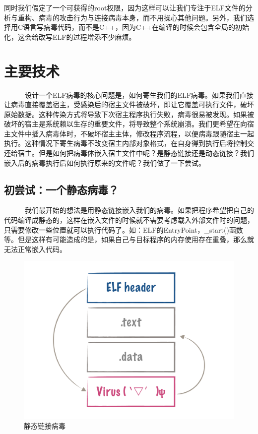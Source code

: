 \documentclass[11pt]{article}
\begin{document}
	同时我们假定了一个可获得的root权限，因为这样可以让我们专注于ELF文件的分析与重构、病毒的攻击行为与连接病毒本身，而不用操心其他问题。另外，我们选择用C语言写病毒代码，而不是C++，因为C++在编译的时候会包含全局的初始化，这会给改写ELF的过程增添不少麻烦。

\newpage
\section{主要技术}
~~~~~~设计一个ELF病毒的核心问题是，如何寄生我们的ELF病毒。如果我们直接让病毒直接覆盖宿主，受感染后的宿主文件被破坏，即让它覆盖可执行文件，破坏原始数据。这种传染方式将导致下次宿主程序执行失败，病毒很易被发现。如果被破坏的宿主是系统赖以生存的重要文件，将导致整个系统崩溃。我们更希望在向宿主文件中插入病毒体时，不破坏宿主主体，修改程序流程，以便病毒跟随宿主一起执行。这种情况下寄生病毒不改变宿主内部对象格式，在自身得到执行后将控制交还给宿主。但是如何把病毒体嵌入宿主文件中呢？是静态链接还是动态链接？我们嵌入后的病毒执行后如何执行原来的文件呢？我们做了一下尝试。
\subsection{初尝试：一个静态病毒？}
~~~~~~我们最开始的想法是用静态链接嵌入我们的病毒。如果把程序希望把自己的代码编译成静态的，这样在嵌入文件的时候就不需要考虑载入外部文件时的问题，只需要修改一些位置就可以执行代码了。如：ELF的EntryPoint，\_start()函数等。但是这样有可能造成的是，如果自己与目标程序的内存使用存在重叠，那么就无法正常嵌入代码。
\vspace{1em}
	\begin{figure}[htbp]
		\centering
		\includegraphics[width = \textwidth]{figures/fig1_order}
		\caption{静态链接病毒}
		\label{fig:way1}
	\end{figure}
\end{document}
